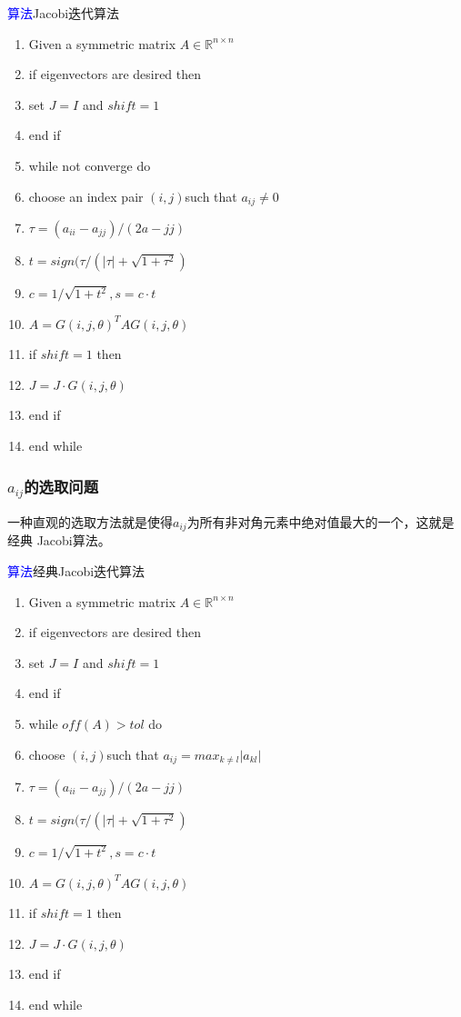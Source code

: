 \documentclass[notheorems,serif]{beamer}
\begin{document}
\begin{frame}
\textcolor{blue}{算法}\quad Jacobi迭代算法
\begin{enumerate}[1:]
	\item Given a symmetric matrix $A\in \mathbb R^{n\times n}$
	\item if eigenvectors are desired then
	\item \quad set $J=I$ and $shift=1$
	\item end if
	\item while not converge do
	\item \quad choose an index pair $(i,j)$such that $a_{ij}\neq 0$
	\item \quad $\tau=(a_{ii}-a_{jj})/(2a-{jj})$
	\item \quad $t=sign(\tau/(|\tau|+\sqrt{1+\tau ^2})$
	\item \quad $c=1/\sqrt{1+t^2},s=c\cdot t$
	\item \quad $A=G(i,j,\theta)^TAG(i,j,\theta)$
	\item \quad if $shift=1$ then 
	\item \qquad $J=J\cdot G(i,j,\theta)$
	\item \quad end if
	\item end while
\end{enumerate}
\end{frame}
\begin{frame}
\frametitle{$a_{ij}$的选取问题}



\qquad 一种直观的选取方法就是使得$a_{ij}$为所有非对角元素中绝对值最大的一个，这就是经典
Jacobi算法。\\
\end{frame}
\begin{frame}

\textcolor{blue}{算法}\quad 经典Jacobi迭代算法
\begin{enumerate}[1:]
	\item Given a symmetric matrix $A\in \mathbb R^{n\times n}$  
	\item if eigenvectors are desired then  
	\item \quad set $J=I$ and $shift=1$  
	\item end if  
	\item while $off(A)>tol $ do
	\item \quad choose $(i,j)$such that $a_{ij}=max_{k\neq l}|a_{kl}|$  
	\item \quad $\tau=(a_{ii}-a_{jj})/(2a-{jj})$  
	\item \quad $t=sign(\tau/(|\tau|+\sqrt{1+\tau ^2})$  
	\item \quad $c=1/\sqrt{1+t^2},s=c\cdot t$  
	\item \quad $A=G(i,j,\theta)^TAG(i,j,\theta)$  
	\item \quad if $shift=1$ then   
	\item \qquad $J=J\cdot G(i,j,\theta)$  
	\item \quad end if  
	\item end while  
\end{enumerate}  
\end{frame}
\end{document}
